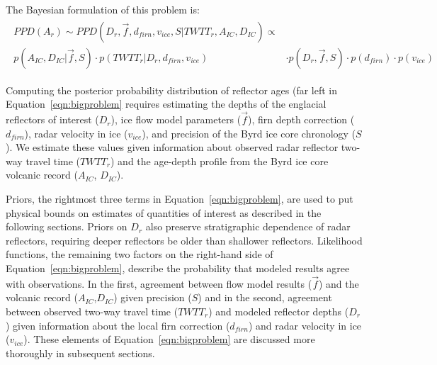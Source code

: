 
The Bayesian formulation of this problem is:
\begin{equation}\label{eqn:bigproblem}
\begin{split} %
\begin{aligned}
PPD(A_r)  \sim  PPD(D_r,\vec{f},d_{firn},v_{ice},S | TWTT_r,A_{IC},D_{IC})  \propto & \\
   p(A_{IC},D_{IC} | \vec{f},S)    \cdot p(TWTT_r | D_r,d_{firn},v_{ice})  & \cdot p(D_r,\vec{f},S) \cdot p(d_{firn})\cdot p(v_{ice})
\end{aligned}
\end{split}
\end{equation}

Computing the posterior probability distribution of reflector ages (far left in Equation~\ref{eqn:bigproblem} requires estimating the depths of the englacial reflectors of interest ($D_r$), ice flow model parameters ($\vec{f}$), firn depth correction ($d_{firn}$), radar velocity in ice ($v_{ice}$), and precision of the Byrd ice core chronology ($S$). We estimate these values given information about observed radar reflector two-way travel time ($TWTT_r$) and the age-depth profile from the Byrd ice core volcanic record ($A_{IC}$, $D_{IC}$). 


Priors, the rightmost three terms in Equation~\ref{eqn:bigproblem}, are used to put physical bounds on estimates of quantities of interest as described in the following sections. Priors on ${D_r}$ also preserve stratigraphic dependence of radar reflectors, requiring deeper reflectors be older than shallower reflectors. Likelihood functions, the remaining two factors on the right-hand side of Equation~\ref{eqn:bigproblem}, describe the probability that modeled results agree with observations. In the first, agreement between flow model results ($\vec{f}$) and the volcanic record ($A_{IC}$,$D_{IC}$) given precision ($S$) and in the second, agreement between observed two-way travel time ($TWTT_r$) and modeled reflector depths ($D_r$) given information about the local firn correction ($d_{firn}$) and radar velocity in ice ($v_{ice}$). These elements of Equation~\ref{eqn:bigproblem} are discussed more thoroughly in subsequent sections.

